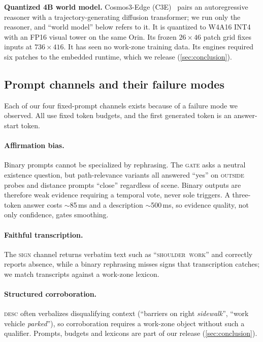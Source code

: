 \documentclass[conference]{IEEEtran}
\let\oldtextsc\textsc
\renewcommand{\textsc}[1]{\mbox{\oldtextsc{#1}}}
\begin{document}
\textbf{Quantized 4B world model.}  Cosmos3-Edge (C3E)~\cite{nvidia2026cosmos3} pairs an autoregressive reasoner with a trajectory-generating diffusion transformer; we run only the reasoner, and ``world model'' below refers to it.  It is quantized to W4A16 INT4 with an FP16 visual tower on the same Orin.  Its frozen $26{\times}46$ patch grid fixes inputs at $736{\times}416$.  It has seen no work-zone training data.  Its engines required six patches to the embedded runtime, which we release (\cref{sec:conclusion}).

\subsection{Prompt channels and their failure modes}
\label{sec:prompts}

Each of our four fixed-prompt channels exists because of a failure mode we observed.  All use fixed token budgets, and the first generated token is an answer-start token.

\paragraph{Affirmation bias.} Binary prompts cannot be specialized by rephrasing.  The \textsc{gate} asks a neutral existence question, but path-relevance variants all answered ``yes'' on \textsc{outside} probes and distance prompts ``close'' regardless of scene.  Binary outputs are therefore weak evidence requiring a temporal vote, never sole triggers.  A three-token answer costs $\sim$85\,ms and a description $\sim$500\,ms, so evidence quality, not only confidence, gates smoothing.

\paragraph{Faithful transcription.} The \textsc{sign} channel returns verbatim text such as ``\textsc{shoulder work}'' and correctly reports absence, while a binary rephrasing misses signs that transcription catches; we match transcripts against a work-zone lexicon.

\paragraph{Structured corroboration.} \textsc{desc} often verbalizes disqualifying context (``barriers on right \emph{sidewalk}'', ``work vehicle \emph{parked}''), so corroboration requires a work-zone object without such a qualifier.  Prompts, budgets and lexicons are part of our release (\cref{sec:conclusion}).
\end{document}
